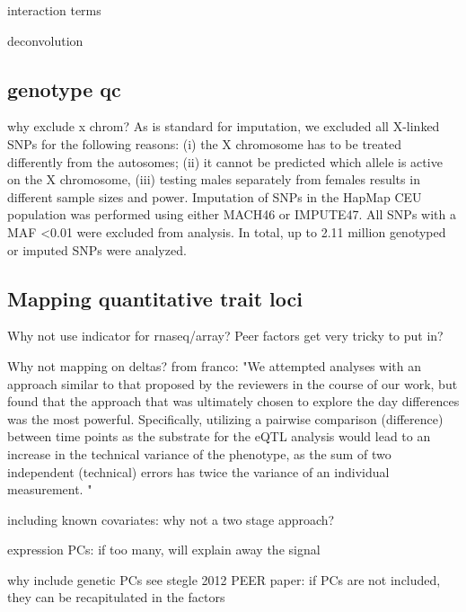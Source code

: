 interaction terms

deconvolution

\subsection{genotype qc}

why exclude x chrom?
As is standard for imputation, we excluded all X-linked SNPs for the following reasons: (i) the X chromosome has to be treated differently from the autosomes; (ii) it cannot be predicted which allele is active on the X chromosome, (iii) testing males separately from females results in different sample sizes and power. Imputation of SNPs in the HapMap CEU population was performed using either MACH46 or IMPUTE47. All SNPs with a MAF <0.01 were excluded from analysis. In total, up to 2.11 million genotyped or imputed SNPs were analyzed.

\subsection{Mapping quantitative trait loci}

Why not use indicator for rnaseq/array?
Peer factors get very tricky to put in?

Why not mapping on deltas?
from franco: "We attempted analyses with an approach similar to that proposed by the reviewers in the course of our work, but found that the approach that was ultimately chosen to explore the day differences was the most powerful. Specifically, utilizing a pairwise comparison (difference) between time points as the substrate for the eQTL analysis would lead to an increase in the technical variance of the phenotype, as the sum of two independent (technical) errors has twice the variance of an individual measurement. "

including known covariates: why not a two stage approach?

expression PCs: if too many, will explain away the signal

why include genetic PCs
see stegle 2012 PEER paper: if PCs are not included, they can be recapitulated in the factors

